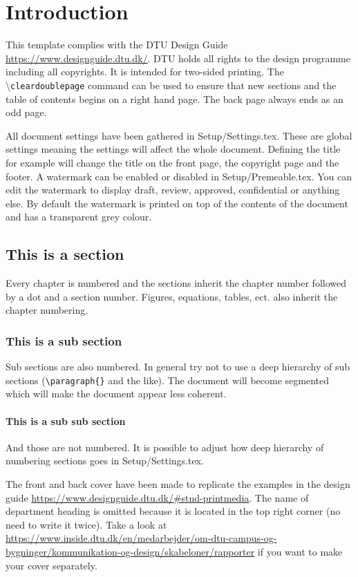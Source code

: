 \chapter{Introduction}
This template complies with the DTU Design Guide
\url{https://www.designguide.dtu.dk/}. DTU holds all rights to the
design programme including all copyrights. It is intended for
two-sided printing. The \textbackslash \texttt{cleardoublepage}
command can be used to ensure that new sections and the table of
contents begins on a right hand page. The back page always ends as an odd page.

All document settings have been gathered in Setup/Settings.tex. These
are global settings meaning the settings will affect the whole
document. Defining the title for example will change the title on the
front page, the copyright page and the footer. A watermark can be
enabled or disabled in Setup/Premeable.tex. You can edit the
watermark to display draft, review, approved, confidential or
anything else. By default the watermark is printed on top of the
contents of the document and has a transparent grey colour.

\section{This is a section}
Every chapter is numbered and the sections inherit the chapter number
followed by a dot and a section number. Figures, equations, tables,
ect. also inherit the chapter numbering.

\subsection{This is a sub section}
Sub sections are also numbered. In general try not to use a deep
hierarchy of sub sections (\texttt{\textbackslash paragraph\{\}} and
the like). The document will become segmented which will make the
document appear less coherent.

\subsubsection{This is a sub sub section}
And those are not numbered. It is possible to adjust how deep
hierarchy of numbering sections goes in Setup/Settings.tex.

The front and back cover have been made to replicate the examples in
the design guide
\url{https://www.designguide.dtu.dk/#stnd-printmedia}. The name of
department heading is omitted  because it is located in the top right
corner (no need to write it twice). Take a look at
\url{https://www.inside.dtu.dk/en/medarbejder/om-dtu-campus-og-bygninger/kommunikation-og-design/skabeloner/rapporter}
if you want to make your cover separately.

